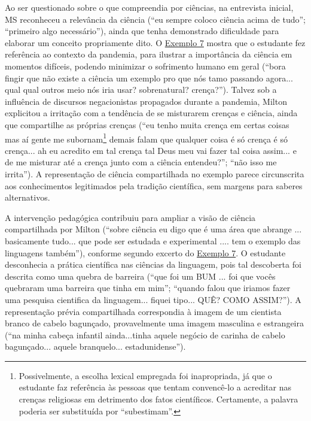 Ao ser questionado sobre o que compreendia por ciências, na entrevista
inicial, MS reconheceu a relevância da ciência (``eu sempre coloco
ciência acima de tudo''; ``primeiro algo necessário''), ainda que tenha
demonstrado dificuldade para elaborar um conceito propriamente dito. O
\hyperref[tab-08]{Exemplo 7} mostra que o estudante fez referência ao contexto da pandemia,
para ilustrar a importância da ciência em momentos difíceis, podendo
minimizar o sofrimento humano em geral (``bora fingir que não existe a
ciência um exemplo pro que nós tamo passando agora... qual qual outros
meio nós iria usar? sobrenatural? crença?''). Talvez sob a influência de
discursos negacionistas propagados durante a pandemia, Milton explicitou
a irritação com a tendência de se misturarem crenças e ciência, ainda
que compartilhe as próprias crenças (``eu tenho muita crença em certas
coisas mas aí gente me subornam\footnote{ Possivelmente, a escolha
	lexical empregada foi inapropriada, já que o estudante faz referência
	às pessoas que tentam convencê-lo a acreditar nas crenças religiosas
	em detrimento dos fatos científicos. Certamente, a palavra poderia ser
	substituída por ``subestimam''.} demais falam que qualquer coisa é só
crença é só crença... ah eu acredito em tal crença tal Deus meu vai
fazer tal coisa assim... e de me misturar até a crença junto com a
ciência entendeu?''; ``não isso me irrita''). A representação de ciência
compartilhada no exemplo parece circunscrita aos conhecimentos
legitimados pela tradição científica, sem margens para saberes
alternativos.




\label{anchor-12}{}


A intervenção pedagógica contribuiu para ampliar a visão de ciência
compartilhada por Milton (``sobre ciência eu digo que é uma área que
abrange ... basicamente tudo... que pode ser estudada e experimental
.... tem o exemplo das linguagens também''), conforme segundo excerto do
\hyperref[tab-08]{Exemplo 7}. O estudante desconhecia a prática científica nas ciências da
linguagem, pois tal descoberta foi descrita como uma quebra de barreira
(``que foi um BUM ... foi que vocês quebraram uma barreira que tinha em
mim''; ``quando falou que iriamos fazer uma pesquisa cientifica da
linguagem... fiquei tipo... QUÊ? COMO ASSIM?''). A representação prévia
compartilhada correspondia à imagem de um cientista branco de cabelo
bagunçado, provavelmente uma imagem masculina e estrangeira (``na minha
cabeça infantil ainda...tinha aquele negócio de carinha de cabelo
bagunçado... aquele branquelo... estadunidense'').


